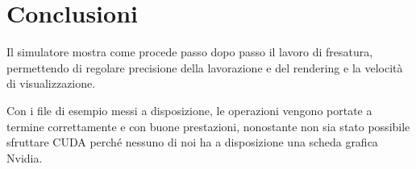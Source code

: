 \section{Conclusioni}
Il simulatore mostra come procede passo dopo passo il lavoro di fresatura, permettendo di regolare precisione della lavorazione e del rendering e la velocità di visualizzazione.

Con i file di esempio messi a disposizione, le operazioni vengono portate a termine correttamente e con buone prestazioni, nonostante non sia stato possibile sfruttare CUDA perché nessuno di noi ha a disposizione una scheda grafica Nvidia.

